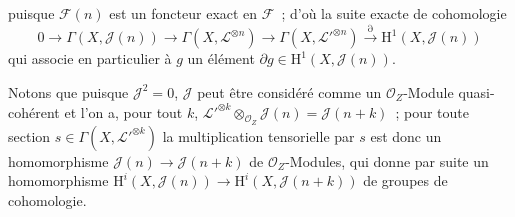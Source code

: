 
puisque $\mathcal{F}(n)$ est un foncteur exact en $\mathcal{F}$~; d'où la
suite exacte de cohomologie
\[
  0\longrightarrow\Gamma(X,\mathcal{J}(n))\longrightarrow
  \Gamma(X,\mathcal{L}^{\otimes n})\longrightarrow
  \Gamma(X,\mathcal{L}'^{\otimes n})\xrightarrow{\partial}
  \mathrm{H}^1(X,\mathcal{J}(n))
\]
qui associe en particulier à $g$ un élément
$\partial g\in\mathrm{H}^1(X,\mathcal{J}(n))$.

Notons que puisque $\mathcal{J}^2=0$, $\mathcal{J}$ peut être considéré
comme un $\mathcal{O}_Z$-Module quasi-cohérent et l'on a, pour tout $k$,
$\mathcal{L}'^{\otimes k}\otimes_{\mathcal{O}_Z}\mathcal{J}(n)
=\mathcal{J}(n+k)$~; pour toute section
$s\in\Gamma(X,\mathcal{L}'^{\otimes k})$ la multiplication tensorielle par
$s$ est donc un homomorphisme $\mathcal{J}(n)\to\mathcal{J}(n+k)$ de
$\mathcal{O}_Z$-Modules, qui donne par suite un homomorphisme
$\mathrm{H}^i(X,\mathcal{J}(n))\to
\mathrm{H}^i(X,\mathcal{J}(n+k))$ de groupes de cohomologie.

